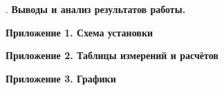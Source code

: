 \documentclass[12pt]{article}
\begin{document}
    . \textbf{Выводы и анализ результатов работы.}

    

    \clearpage

    \begin{center}
        \LARGE
        \textbf{Приложение 1. Схема установки}
    \end{center}

    \mediumvspace

    

    \clearpage

    \begin{center}
        \LARGE
        \textbf{Приложение 2. Таблицы измерений и расчётов}
    \end{center}

    \mediumvspace

    

    

    \clearpage

    \begin{center}
        \LARGE
        \textbf{Приложение 3. Графики}
    \end{center}

    \mediumvspace

    
\end{document}
